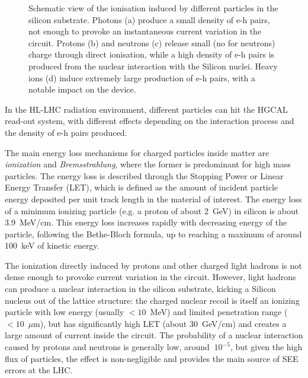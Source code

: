 \begin{figure}
    \hspace{0.1cm}
    \caption{Schematic view of the ionisation induced by different particles in the silicon substrate. Photons (a) produce a small density of e-h pairs, not enough to provoke an instantaneous current variation in the circuit. Protons (b) and neutrons (c) release small (no for neutrons) charge through direct ionisation, while a high density of e-h pairs is produced from the nuclear interaction with the Silicon nuclei. Heavy ions (d) induce extremely large production of e-h pairs, with a notable impact on the device.}
    \label{fig:SEE_ParticleInteraction}
\end{figure}

In the HL-LHC radiation environment, different particles can hit the HGCAL read-out system, with different effects depending on the interaction process and the density of e-h pairs produced. 

\bigbreak

The main energy loss mechanisms for charged particles inside matter are \textit{ionization} and \textit{Bremsstrahlung}, where the former is predominant for high mass particles. 
The energy loss is described through the Stopping Power or Linear Energy Transfer (LET), which is defined as the amount of incident particle energy deposited per unit track length in the material of interest.
The energy loss of a minimum ionizing particle (e.g. a proton of about 2~GeV) in silicon is about 3.9~MeV/cm. This energy loss increases rapidly with decreasing energy of the particle, following the Bethe-Bloch formula, up to reaching a maximum of around 100~keV of kinetic energy.

The ionization directly induced by protons and other charged light hadrons is not dense enough to provoke current variation in the circuit. 
However, light hadrons can produce a nuclear interaction in the silicon substrate, kicking a Silicon nucleus out of the lattice structure: the charged nuclear recoil is itself an ionizing particle with low energy (usually $<10$~MeV) and limited penetration range ($<10$~$\mu$m), but has significantly high LET (about 30~GeV/cm) and creates a large amount of current inside the circuit.
The probability of a nuclear interaction caused by protons and neutrons is generally low, around $~10^{-5}$, but given the high flux of particles, the effect is non-negligible and provides the main source of SEE errors at the LHC.

